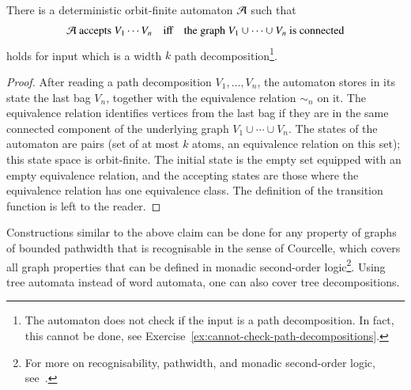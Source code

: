 \begin{myexample}
	 \begin{claim}\label{claim:connected}
	 There is a deterministic orbit-finite automaton ${\mathcal A}$ such that
	 \begin{align*}
	 {\mathcal A} \text{ accepts }V_1 \cdots V_n \quad \text{iff} \quad \text{the  graph $V_1 \cup \cdots \cup V_n$ is connected}
	 \end{align*}
	 holds for input which is a width $k$ path decomposition\footnote{The automaton does not check if the input is a path decomposition. In fact, this cannot be done, see Exercise~\ref{ex:cannot-check-path-decompositions}.}.
	 \end{claim}
	 \begin{proof}
	 After reading a path decomposition $V_1,\ldots,V_n$, the automaton stores in its state the last bag $V_n$, together with the equivalence relation $\sim_n$ on it. The equivalence relation identifies vertices from the last bag if they are in the same connected component of the underlying graph $V_1 \cup \cdots \cup V_n$.  
	 The states of the automaton are pairs (set of at most $k$ atoms, an equivalence relation on this set); this state space is orbit-finite. The initial state is the empty set equipped with an empty equivalence relation, and the accepting states are those where the equivalence relation has one equivalence class. 
	 The definition of the transition function is left to the reader. 
	 \end{proof}
	
	 Constructions similar to the above claim can be done for any property of graphs of bounded pathwidth that is recognisable in the sense of Courcelle, which covers all graph properties that can be defined in monadic second-order logic\footnote{For more on recognisability, pathwidth, and monadic second-order logic, see~\cite[Chapter 5.3]{courcelleGraphStructureMonadic2012}.}. Using tree automata instead of word automata, one can also cover tree decompositions. 
   \end{myexample}
   


